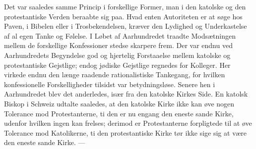 \documentclass[12pt,a4paper,openany]{book}
\newcommand{\opage}[1]{\marginnote{\footnotesize\textit{[#1]}}}
\begin{document}
Det var saaledes samme Princip i forskellige Former, man i den
katolske og den protestantiske Verden beraabte sig paa. Hvad enten
Autoriteten er at søge hos Paven, i Bibelen eller i Trosbekendelsen,
kræver den Lydighed og Underkastelse af al egen Tanke og Følelse.
I Løbet af Aarhundredet traadte Modsætningen mellem de forskellige
Konfessioner stedse skarpere frem. Der var endnu ved Aarhundredets
Begyndelse god og hjertelig Forstaaelse mellem katolske og
protestantiske Gejstlige; endog jødiske Gejstlige regnedes for Kolleger.
Her virkede endnu den længe raadende rationalistiske Tankegang,
for hvilken konfessionelle Forskelligheder tilsidst var betydningsløse.
Senere hen i Aarhundredet blev det anderledes, især fra
den katolske Kirkes Side. En katolsk Biskop i Schweiz udtalte saaledes,
at den katolske Kirke ikke kan øve nogen Tolerance mod
\opage{118}Protestanterne, ti den er nu engang den eneste sande Kirke, udenfor
hvilken ingen kan frelses; derimod er Protestanterne forpligtede
til at øve Tolerance mod Katolikerne, ti den protestantiske Kirke
tør ikke sige sig at være den eneste sande Kirke. ---
\end{document}
